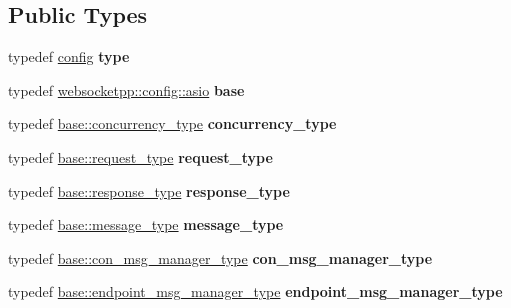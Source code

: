 \subsection*{Public Types}
\begin{DoxyCompactItemize}
\item 
typedef \hyperlink{classconfig}{config} {\bfseries type}\hypertarget{structconfig__tls_a182bf35d72859e8ac56a47d25186694e}{}\label{structconfig__tls_a182bf35d72859e8ac56a47d25186694e}

\item 
typedef \hyperlink{structwebsocketpp_1_1config_1_1asio}{websocketpp\+::config\+::asio} {\bfseries base}\hypertarget{structconfig__tls_a74e0ce265ec2603aacff8cb97b650432}{}\label{structconfig__tls_a74e0ce265ec2603aacff8cb97b650432}

\item 
typedef \hyperlink{classwebsocketpp_1_1concurrency_1_1basic}{base\+::concurrency\+\_\+type} {\bfseries concurrency\+\_\+type}\hypertarget{structconfig__tls_a0cd02433cc4d0e0c5a1496d29f2f23df}{}\label{structconfig__tls_a0cd02433cc4d0e0c5a1496d29f2f23df}

\item 
typedef \hyperlink{classwebsocketpp_1_1http_1_1parser_1_1request}{base\+::request\+\_\+type} {\bfseries request\+\_\+type}\hypertarget{structconfig__tls_a5207e17a23de0825f76ed3e18e8f6cb8}{}\label{structconfig__tls_a5207e17a23de0825f76ed3e18e8f6cb8}

\item 
typedef \hyperlink{classwebsocketpp_1_1http_1_1parser_1_1response}{base\+::response\+\_\+type} {\bfseries response\+\_\+type}\hypertarget{structconfig__tls_aed8a4913e19cc2d0467a751544f1dab7}{}\label{structconfig__tls_aed8a4913e19cc2d0467a751544f1dab7}

\item 
typedef \hyperlink{classwebsocketpp_1_1message__buffer_1_1message}{base\+::message\+\_\+type} {\bfseries message\+\_\+type}\hypertarget{structconfig__tls_ab09426b1f992ecad5c63d0b871789482}{}\label{structconfig__tls_ab09426b1f992ecad5c63d0b871789482}

\item 
typedef \hyperlink{classwebsocketpp_1_1message__buffer_1_1alloc_1_1con__msg__manager}{base\+::con\+\_\+msg\+\_\+manager\+\_\+type} {\bfseries con\+\_\+msg\+\_\+manager\+\_\+type}\hypertarget{structconfig__tls_a8bd0cd17282c4c37e5ad988cebdc5a8c}{}\label{structconfig__tls_a8bd0cd17282c4c37e5ad988cebdc5a8c}

\item 
typedef \hyperlink{classwebsocketpp_1_1message__buffer_1_1alloc_1_1endpoint__msg__manager}{base\+::endpoint\+\_\+msg\+\_\+manager\+\_\+type} {\bfseries endpoint\+\_\+msg\+\_\+manager\+\_\+type}\hypertarget{structconfig__tls_a42d7bc91cc851bcd83472b4078362b78}{}\label{structconfig__tls_a42d7bc91cc851bcd83472b4078362b78}


\end{DoxyCompactItemize}
